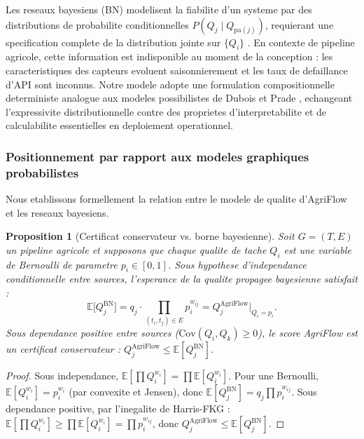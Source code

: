\documentclass[12pt,a4paper]{article}
\theoremstyle{plain}
\newtheorem{proposition}[theorem]{Proposition}
\theoremstyle{definition}
\theoremstyle{remark}
\newcommand{\E}{\mathbb{E}}
\begin{document}
Les reseaux bayesiens (BN) modelisent la fiabilite d'un systeme par
des distributions de probabilite conditionnelles
$P(Q_j \mid Q_{\text{pa}(j)})$, requierant une specification complete
de la distribution jointe sur $\{Q_i\}$ \cite{bayesian_reliability}.
En contexte de pipeline agricole, cette information est indisponible
au moment de la conception : les caracteristiques des capteurs evoluent
saisonnierement et les taux de defaillance d'API sont inconnus.
Notre modele adopte une formulation compositionnelle deterministe
analogue aux modeles possibilistes de Dubois et Prade
\cite{possibility_theory}, echangeant l'expressivite distributionnelle
contre des proprietes d'interpretabilite et de calculabilite essentielles
en deploiement operationnel.

\subsubsection{Positionnement par rapport aux modeles graphiques probabilistes}
\label{subsec:pgm_positioning}

Nous etablissons formellement la relation entre le modele de qualite
d'AgriFlow et les reseaux bayesiens.

\begin{proposition}[Certificat conservateur vs. borne bayesienne]
\label{prop:bayes_bound}
Soit $G=(T,E)$ un pipeline agricole et supposons que chaque qualite de
tache $Q_i$ est une variable de Bernoulli de parametre $p_i \in [0,1]$.
Sous hypothese d'independance conditionnelle entre sources,
l'esperance de la qualite propagee bayesienne satisfait :
\begin{equation}
\E\bigl[Q_j^{\mathrm{BN}}\bigr]
= q_j \cdot \prod_{(t_i,t_j)\in E} p_i^{w_{ij}}
= Q_j^{\mathrm{AgriFlow}}\big|_{Q_i = p_i}.
\label{eq:bayes_equiv}
\end{equation}
Sous dependance positive entre sources ($\text{Cov}(Q_i,Q_k) \geq 0$),
le score AgriFlow est un certificat conservateur :
$Q_j^{\mathrm{AgriFlow}} \leq \E[Q_j^{\mathrm{BN}}]$.
\end{proposition}

\begin{proof}
Sous independance, $\E[\prod Q_i^{w_i}] = \prod \E[Q_i^{w_i}]$.
Pour une Bernoulli, $\E[Q_i^{w_i}] = p_i^{w_i}$ (par convexite et
Jensen), donc $\E[Q_j^{\mathrm{BN}}] = q_j \prod p_i^{w_{ij}}$.
Sous dependance positive, par l'inegalite de Harris-FKG
\cite{fkg_inequality} : $\E[\prod Q_i^{w_i}] \geq \prod \E[Q_i^{w_i}]
= \prod p_i^{w_{ij}}$, donc $Q_j^{\mathrm{AgriFlow}} \leq
\E[Q_j^{\mathrm{BN}}]$.
\end{proof}
\end{document}
